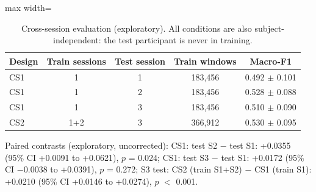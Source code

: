 \begin{table}[t]
\centering
\small
\caption{Cross-session evaluation (exploratory). All conditions are also subject-independent: the test participant is never in training.}
\label{tab:cross_session}
\setlength{\tabcolsep}{4pt}
\begin{adjustbox}{max width=\textwidth}
\begin{tabular}{lcccc}
\toprule
Design & Train sessions & Test session & Train windows & Macro-F1 \\
\midrule
CS1 & 1 & 1 & 183{,}456 & 0.492 $\pm$ 0.101 \\
CS1 & 1 & 2 & 183{,}456 & 0.528 $\pm$ 0.088 \\
CS1 & 1 & 3 & 183{,}456 & 0.510 $\pm$ 0.090 \\
CS2 & 1+2 & 3 & 366{,}912 & 0.530 $\pm$ 0.095 \\
\bottomrule
\end{tabular}
\end{adjustbox}
\par\smallskip\parbox{0.95\linewidth}{\footnotesize Paired contrasts (exploratory, uncorrected): CS1: test S2 $-$ test S1: +0.0355 (95\% CI +0.0091 to +0.0621), $p$ = 0.024; CS1: test S3 $-$ test S1: +0.0172 (95\% CI $-$0.0038 to +0.0391), $p$ = 0.272; S3 test: CS2 (train S1+S2) $-$ CS1 (train S1): +0.0210 (95\% CI +0.0146 to +0.0274), $p$ $<$ 0.001.}
\end{table}
